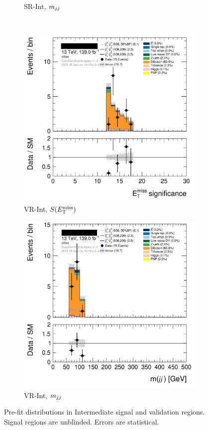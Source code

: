 \begin{figure}[tp]
\begin{subfigure}{0.495\textwidth}
\caption{SR-Int, $m_{jj}$}
\end{subfigure}
\\[0.5em]
\begin{subfigure}{0.495\textwidth}
\centering
\includegraphics[width=\textwidth]{figures/2ljets_def_met_Sign_VRInt.png}
\caption{VR-Int, $S(E_\mathrm{T}^\mathrm{miss})$}
\end{subfigure}
\hfill
\begin{subfigure}{0.495\textwidth}
\centering
\includegraphics[width=\textwidth]{figures/2ljets_def_mjj_VRInt.png}
\caption{VR-Int, $m_{jj}$}
\end{subfigure}
\caption[
Pre-fit distributions in Intermediate signal and validation regions
]{%
Pre-fit distributions in Intermediate signal and validation regions.
Signal regions are unblinded.
Errors are statistical.
}
\label{fig:2ljets_int_region}
\end{figure}

